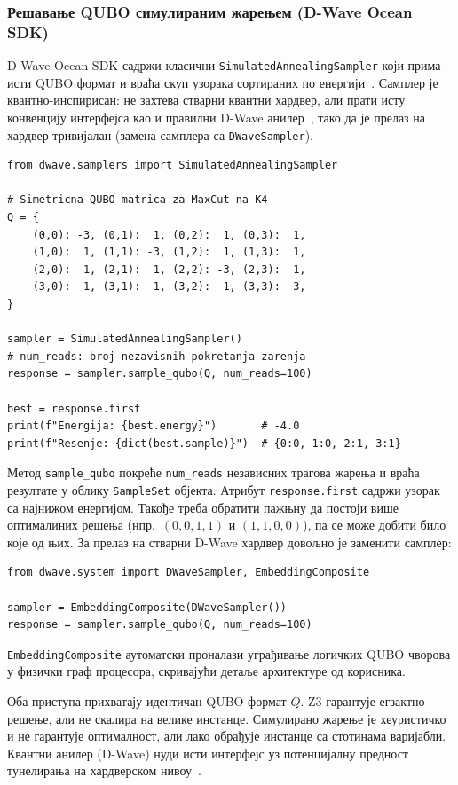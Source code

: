 \subsubsection{Решавање QUBO симулираним жарењем (D-Wave Ocean SDK)}

D-Wave Ocean SDK садржи класични \texttt{SimulatedAnnealingSampler}
који прима исти QUBO формат и враћа скуп узорака сортираних
по енергији~\cite{kirkpatrick1983}. Самплер је квантно-инспирисан: не захтева стварни
квантни хардвер, али прати исту конвенцију интерфејса као и
правилни D-Wave анилер~\cite{johnson2011}, тако да је прелаз на хардвер тривијалан
(замена самплера са \texttt{DWaveSampler}).

\begin{example}
\begin{lstlisting}[style=python, caption={Решавање QUBO симулираним жарењем преко D-Wave Ocean SDK-а.}]
from dwave.samplers import SimulatedAnnealingSampler

# Simetricna QUBO matrica za MaxCut na K4
Q = {
    (0,0): -3, (0,1):  1, (0,2):  1, (0,3):  1,
    (1,0):  1, (1,1): -3, (1,2):  1, (1,3):  1,
    (2,0):  1, (2,1):  1, (2,2): -3, (2,3):  1,
    (3,0):  1, (3,1):  1, (3,2):  1, (3,3): -3,
}

sampler = SimulatedAnnealingSampler()
# num_reads: broj nezavisnih pokretanja zarenja
response = sampler.sample_qubo(Q, num_reads=100)

best = response.first
print(f"Energija: {best.energy}")       # -4.0
print(f"Resenje: {dict(best.sample)}")  # {0:0, 1:0, 2:1, 3:1}
\end{lstlisting}
\end{example}

Метод \texttt{sample\_qubo} покреће \texttt{num\_reads} независних
трагова жарења и враћа резултате у облику \texttt{SampleSet} објекта.
Атрибут \texttt{response.first} садржи узорак са најнижом енергијом.
Такође треба обратити пажњну да постоји више оптималиних решења (нпр.\ $(0,0,1,1)$ и $(1,1,0,0)$), па се може добити било које од њих.
За прелаз на стварни D-Wave хардвер довољно је заменити самплер:

\begin{lstlisting}[style=python, caption={Прелаз на D-Wave хардвер тј. само се самплер мења.}]
from dwave.system import DWaveSampler, EmbeddingComposite

sampler = EmbeddingComposite(DWaveSampler())
response = sampler.sample_qubo(Q, num_reads=100)
\end{lstlisting}

\texttt{EmbeddingComposite} аутоматски проналази уграђивање
логичких QUBO чворова у физички граф процесора,
скривајући детаље архитектуре од корисника.


\begin{remark}
Оба приступа прихватају идентичан QUBO формат $Q$.
Z3 гарантује егзактно решење, али не скалира на велике инстанце.
Симулирано жарење је хеуристичко и не гарантује оптималност,
али лако обрађује инстанце са стотинама варијабли.
Квантни анилер (D-Wave) нуди исти интерфејс уз потенцијалну
предност тунелирања на хардверском нивоу~\cite{mcgeoch2014}.
\end{remark}
